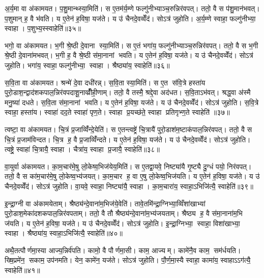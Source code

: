 अ॒र्य॒मा वा अ॑कामयत। प॒शु॒मान्थ्स्या॒मिति॑। स ए॒तम॑र्य॒म्णे फल्गु॑नीभ्याञ्च॒रुन्निर॑वपत्। ततो॒ वै स प॑शु॒मान॑भवत्। प॒शुमान् ह॒ वै भ॑वति। य ए॒तेन॑ ह॒विषा॒ यज॑ते। य उ॑ चैनदे॒वव्वेँद॑। सोऽत्र॑ जुहोति। अ॒र्य॒म्णे स्वाहा॒ फल्गु॑नीभ्या॒ स्वाहा। प॒शुभ्य॒स्स्वाहेति॑॥३५॥

भगो॒ वा अ॑कामयत। भ॒गी श्रे॒ष्ठी दे॒वाना स्या॒मिति॑। स ए॒तं भगा॑य॒ फल्गु॑नीभ्याञ्च॒रुन्निर॑वपत्। ततो॒ वै स भ॒गी श्रे॒ष्ठी दे॒वाना॑मभवत्। भ॒गी ह॒ वै श्रे॒ष्ठी स॑मा॒नानां भवति। य ए॒तेन॑ ह॒विषा॒ यज॑ते। य उ॑ चैनदे॒वव्वेँद॑। सोऽत्र॑ जुहोति। भगा॑य॒ स्वाहा॒ फल्गु॑नीभ्या॒ स्वाहा। श्रैष्ठ्या॑य॒ स्वाहेति॑॥३६॥

स॒वि॒ता वा अ॑कामयत। श्रन्मे॑ दे॒वा दधी॑रन्न्। स॒वि॒ता स्या॒मिति॑। स ए॒त स॑वि॒त्रे हस्ता॑य पुरो॒डाश॒न्द्वाद॑शकपाल॒न्निर॑वपदाशू॒नाव्व्रीँ॑ही॒णाम्। ततो॒ वै तस्मै॒ श्रद्दे॒वा अद॑धत। स॒वि॒ताऽभ॑वत्। श्रद्ध॒वा अ॑स्मै मनु॒ष्या॑ दधते। स॒वि॒ता स॑मा॒नानां भवति। य ए॒तेन॑ ह॒विषा॒ यज॑ते। य उ॑ चैनदे॒वव्वेँद॑। सोऽत्र॑ जुहोति। स॒वि॒त्रे स्वाहा॒ हस्ता॑य। स्वाहा॑ दद॒ते स्वाहा॑ पृण॒ते। स्वाहा प्र॒यच्छ॑ते॒ स्वाहा प्रतिगृभ्ण॒ते स्वाहेति॑ ॥३७॥

त्वष्टा॒ वा अ॑कामयत। चि॒त्रं प्र॒जाव्विँ॑न्दे॒येति॑। स ए॒तन्त्वष्ट्रे॑ चि॒त्रायै॑ पुरो॒डाश॑म॒ष्टाक॑पाल॒न्निर॑वपत्। ततो॒ वै स चि॒त्रं प्र॒जाम॑विन्दत। चि॒त्र ह॒ वै प्र॒जाव्विँ॑न्दते। य ए॒तेन॑ ह॒विषा॒ यज॑ते। य उ॑ चैनदे॒वव्वेँद॑। सोऽत्र॑ जुहोति। त्वष्ट्रे॒ स्वाहा॑ चि॒त्रायै॒ स्वाहा। चैत्रा॑य॒ स्वाहा प्र॒जायै॒ स्वाहेति॑॥३८॥

वा॒युर्वा अ॑कामयत। का॒म॒चार॑मे॒षु लो॒केष्व॒भिज॑येय॒मिति॑। स ए॒तद्वा॒यवे॒ निष्ट्या॑यै गृ॒ष्ट्यै दु॒ग्धं पयो॒ निर॑वपत्। ततो॒ वै स का॑म॒चार॑मे॒षु लो॒केष्व॒भ्य॑जयत्। का॒म॒चार ह॒ वा ए॒षु लो॒केष्व॒भिज॑यति। य ए॒तेन॑ ह॒विषा॒ यज॑ते। य उ॑ चैनदे॒वव्वेँद॑। सोऽत्र॑ जुहोति। वा॒यवे॒ स्वाहा॒ निष्ट्या॑यै॒ स्वाहा। का॒म॒चारा॑य॒ स्वाहा॒ऽभिजि॑त्यै॒ स्वाहेति॑॥३९॥

इ॒न्द्रा॒ग्नी वा अ॑कामयेताम्। श्रैष्ठ्य॑न्दे॒वाना॑म॒भिज॑ये॒वेति॑। तावे॒तमि॑न्द्रा॒ग्निभ्या॒व्विँशा॑खाभ्यां पुरो॒डाश॒मेका॑दशकपाल॒न्निर॑वपताम्। ततो॒ वै तौ श्रैष्ठ्य॑न्दे॒वाना॑म॒भ्य॑जयताम्। श्रैष्ठ्य ह॒ वै स॑मा॒नाना॑म॒भि ज॑यति। य ए॒तेन॑ ह॒विषा॒ यज॑ते। य उ॑ चैनदे॒वव्वेँद॑। सोऽत्र॑ जुहोति। इ॒न्द्रा॒ग्निभ्या॒ स्वाहा॒ विशा॑खाभ्या॒ स्वाहा। श्रैष्ठ्या॑य॒ स्वाहा॒ऽभिजि॑त्यै॒ स्वाहेति॑॥४०॥

अथै॒तत्पौर्णमा॒स्या आज्य॒न्निर्व॑पति। कामो॒ वै पौर्णमा॒सी। काम॒ आज्यम्। कामे॑नै॒व काम॒ सम॑र्धयति। ख्षि॒प्रमे॑न॒ सकाम॒ उप॑नमति। येन॒ कामे॑न॒ यज॑ते। सोऽत्र॑ जुहोति। पौ॒र्ण॒मा॒स्यै स्वाहा॒ कामा॑य॒ स्वाहाऽऽग॑त्यै॒ स्वाहेति॑॥४१॥

